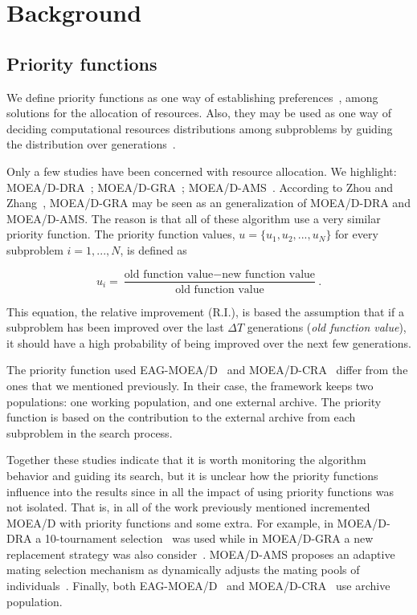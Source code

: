 \section{Background}

\subsection{Priority functions}

We define priority functions as one way of establishing preferences~\cite{chankong1983multiobjective},\cite{hansson2005decision} among solutions for the allocation of resources. Also, they may be used as one way of deciding computational resources distributions among subproblems by guiding the distribution over generations~\cite{cai2015external}. 

Only a few studies have been concerned with resource allocation. We highlight: MOEA/D-DRA~\cite{zhang2009performance}; MOEA/D-GRA~\cite{zhou2016all};  MOEA/D-AMS~\cite{chiang2011moea}. According to Zhou and Zhang~\cite{zhou2016all}, MOEA/D-GRA may be seen as an generalization of MOEA/D-DRA and MOEA/D-AMS. The reason is that all of these algorithm use a very similar priority function. The priority function values, $u = \{u_1, u_2, ..., u_N\}$ for every subproblem $i=1,...,N$, is  defined as

\begin{equation}\label{priority}
	u_i = \dfrac{\text{old function value}-\text{new function value}}{\text{old function value}}.
\end{equation}


This equation, the relative improvement (R.I.), is based the assumption that if a subproblem has been improved over the last $\Delta T$ generations (\textit{old function value}), it should have a high probability of being improved over the next few generations. 
	
The priority function used EAG-MOEA/D~\cite{cai2015external} and MOEA/D-CRA~\cite{kang2018collaborative} differ from the ones that we mentioned previously. In their case, the framework keeps two populations: one working population, and one external archive. The priority function is based on the contribution to the external archive from each subproblem in the search process. 

Together these studies indicate that it is worth monitoring the algorithm behavior and guiding its search, but it is unclear how the priority functions influence into the results since in all the impact of using priority functions was not isolated. That is, in all of the work previously mentioned incremented MOEA/D with priority functions and some extra. For example, in MOEA/D-DRA a 10-tournament selection~\cite{zhang2009performance} was used while in MOEA/D-GRA a new replacement strategy was also consider~\cite{zhou2016all}. MOEA/D-AMS proposes an adaptive mating selection mechanism as dynamically adjusts the mating pools of individuals~\cite{chiang2011moea}. Finally, both EAG-MOEA/D~\cite{cai2015external} and MOEA/D-CRA~\cite{kang2018collaborative} use archive population.


